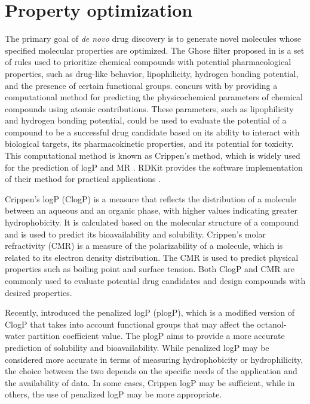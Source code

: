 \section{Property optimization}
The primary goal of \textit{de novo} drug discovery is to generate novel molecules whose specified molecular properties are optimized. The Ghose filter proposed in \cite{ghose1999knowledge} is a set of rules used to prioritize chemical compounds with potential pharmacological properties, such as drug-like behavior, lipophilicity, hydrogen bonding potential, and the presence of certain functional groups. \cite{wildman1999prediction} concurs with \cite{ghose1999knowledge} by providing a computational method for predicting the physicochemical parameters of chemical compounds using atomic contributions. These parameters, such as lipophilicity and hydrogen bonding potential, could be used to evaluate the potential of a compound to be a successful drug candidate based on its ability to interact with biological targets, its pharmacokinetic properties, and its potential for toxicity. This computational method is known as Crippen's method, which is widely used for the prediction of logP and MR \cite{wildman1999prediction}. RDKit provides the software implementation of their method for practical applications \cite{landrum2013rdkit}.

Crippen's logP (ClogP) is a measure that reflects the distribution of a molecule between an aqueous and an organic phase, with higher values indicating greater hydrophobicity. It is calculated based on the molecular structure of a compound and is used to predict its bioavailability and solubility. Crippen's molar refractivity (CMR) is a measure of the polarizability of a molecule, which is related to its electron density distribution. The CMR is used to predict physical properties such as boiling point and surface tension. Both ClogP and CMR are commonly used to evaluate potential drug candidates and design compounds with desired properties.

Recently, \cite{jin2018junction} introduced the penalized logP (plogP), which is a modified version of ClogP that takes into account functional groups that may affect the octanol-water partition coefficient value. The plogP aims to provide a more accurate prediction of solubility and bioavailability. While penalized logP may be considered more accurate in terms of measuring hydrophobicity or hydrophilicity, the choice between the two depends on the specific needs of the application and the availability of data. In some cases, Crippen logP may be sufficient, while in others, the use of penalized logP may be more appropriate.

